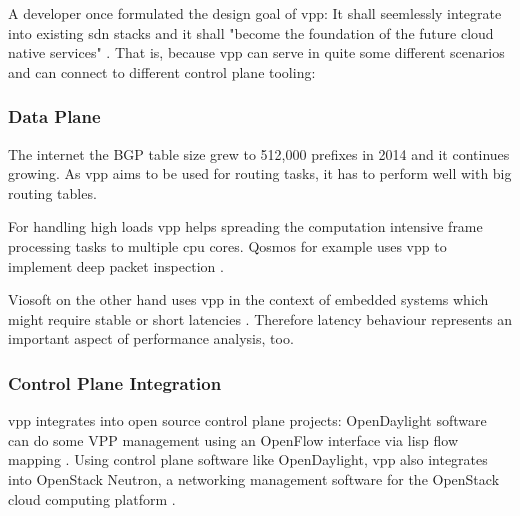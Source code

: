 
A developer once formulated the design goal of \Ac{vpp}: It shall
seemlessly integrate into existing \Ac{sdn} stacks and it shall
"become the foundation of the future cloud native services"
\cite{florincoras}. That is, because \Ac{vpp} can serve in quite some
different scenarios and can connect to different control plane
tooling:

\subsubsection{Data Plane}


The internet the BGP table size grew to 512,000 prefixes in 2014 and
it continues growing. As \Ac{vpp} aims to be used for routing tasks,
it has to perform well with big routing tables. \cite{bgphelp:size}


For handling high loads \Ac{vpp} helps spreading the computation
intensive frame processing tasks to multiple cpu cores. Qosmos for
example uses \Ac{vpp} to implement deep packet inspection
\cite{qosmos}.


Viosoft on the other hand uses \Ac{vpp} in the context of embedded
systems which might require stable or short latencies \cite{viosoft}.
Therefore latency behaviour represents an important aspect of
performance analysis, too.


\subsubsection{Control Plane Integration}

\Ac{vpp} integrates into open source control plane projects:
OpenDaylight software can do some VPP management using an OpenFlow
interface via \Ac{lisp} flow mapping \cite{opendaylight:lisp}. Using
control plane software like OpenDaylight, \Ac{vpp} also integrates
into OpenStack Neutron, a networking management software for the
OpenStack cloud computing platform \cite{fdio:integration}.


